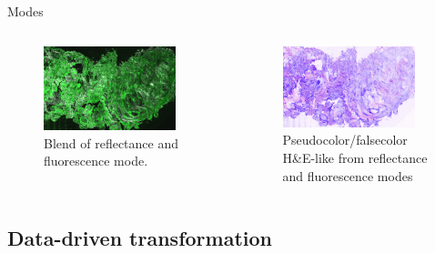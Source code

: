 \documentclass[t]{beamer}
\begin{document}
\begin{frame}{Modes}
{\begin{columns}
\begin{column}{0.5\textwidth}
\begin{figure}
\centering
\includegraphics[width=0.9\textwidth]{CM-blend}
\caption{Blend of reflectance and fluorescence mode.}
\end{figure}
\end{column}

\begin{column}{0.5\textwidth}
\begin{figure}
\centering
\includegraphics[width=0.9\textwidth]{CM-pseudocolor}
\caption{Pseudocolor/falsecolor H\&E-like from reflectance and fluorescence modes}
\end{figure}
\end{column}
\end{columns}
}


\end{frame}

\subsection{Data-driven transformation}
\end{document}
